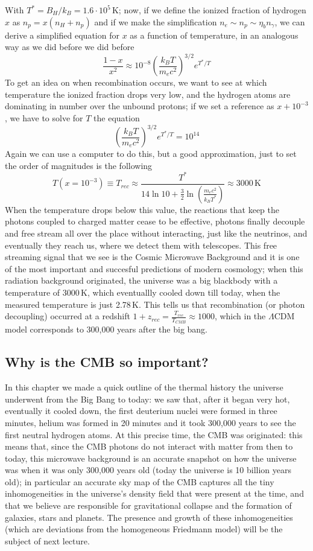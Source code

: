 With $T^*=B_H/k_B=1.6\cdot 10^5$\,K; now, if we define the ionized fraction of hydrogen $x$ as $n_p=x(n_H+n_p)$ and if we make the simplification $n_e\sim n_p\sim \eta_b n_\gamma$, we can derive a simplified equation for $x$ as a function of temperature, in an analogous way as we did before we did before
\begin{equation}
\frac{1-x}{x^2}\approx 10^{-8}\left(\frac{k_BT}{m_ec^2}\right)^{3/2}e^{T^*/T}
\end{equation}
To get an idea on when recombination occurs, we want to see at which temperature the ionized fraction drops very low, and the hydrogen atoms are dominating in number over the unbound protons; if we set a reference as $x+10^{-3}$, we have to solve for $T$ the equation
\begin{equation}
\left(\frac{k_BT}{m_ec^2}\right)^{3/2}e^{T^*/T}=10^{14}
\end{equation}
Again we can use a computer to do this, but a good approximation, just to set the order of magnitudes is the following
\begin{equation}
T(x=10^{-3})\equiv T_{rec}\approx \frac{T^*}{14\ln{10}+\frac{3}{2}\ln{\left(\frac{m_ec^2}{k_BT^*}\right)}}\approx 3000\, \mathrm{K}
\end{equation}
When the temperature drops below this value, the reactions that keep the photons coupled to charged matter cease to be effective, photons finally decouple and free stream all over the place without interacting, just like the neutrinos, and eventually they reach us, where we detect them with telescopes. This free streaming signal that we see is the Cosmic Microwave Background and it is one of the most important and succesful predictions of modern cosmology; when this radiation background originated, the universe was a big blackbody with a temperature of 3000\,K, which eventuallly cooled down till today, when the measured temperature is just 2.78\,K. This tells us that recombination (or photon decoupling) occurred at a redshift $1+z_{rec}=\frac{T_{rec}}{T_{CMB}}\approx 1000$, which in the $\Lambda$CDM model corresponds to 300,000 years after the big bang.  
\subsection{Why is the CMB so important?}
In this chapter we made a quick outline of the thermal history the universe underwent from the Big Bang to today: we saw that, after it began very hot, eventually it cooled down, the first deuterium nuclei were formed in three minutes, helium was formed in 20 minutes and it took 300,000 years to see the first neutral hydrogen atoms. At this precise time, the CMB was originated: this means that, since the CMB photons do not interact with matter from then to today, this microwave background is an accurate snapshot on how the universe was when it was only 300,000 years old (today the universe is 10 billion years old); in particular an accurate sky map of the CMB captures all the tiny inhomogeneities in the universe's density field that were present at the time, and that we believe are responsible for gravitational collapse and the formation of galaxies, stars and planets. The presence and growth of these inhomogeneities (which are deviations from the homogeneous Friedmann model) will be the subject of next 
lecture.